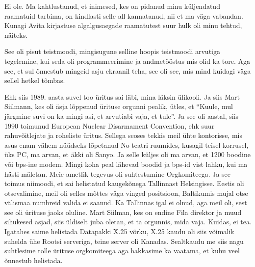 
Ei ole. Ma kahtlustanud, et inimesed, kes on pidanud minu küljendatud raamatuid 
tarbima, on kindlasti selle all kannatanud, nii et ma väga vabandan. Kunagi  
Avita kirjastuse  algalgusaegade raamatutest suur hulk 
oli minu tehtud, näiteks.


See oli pisut teistmoodi, mingisugune selline hoopis teistmoodi  arvutiga 
tegelemine, kui seda  oli  programmeerimine ja andmetööstus mis olid ka tore. 
Aga see, et sul õnnestub mingeid asju ekraanil teha, see oli see, mis mind 
kuidagi väga sellel hetkel tõmbas. 

Ehk siis 1989. aasta suvel too üritus sai läbi, mina läksin ülikooli. Ja siis 
Mart Siilmann, kes oli äsja lõppenud ürituse orgunni 
pealik, ütles, et \enquote{Kuule, mul järgmine suvi on ka mingi asi, et 
arvutiabi vaja, et tule}. Ja see oli aastal, siis 1990 toimunud European 
Nuclear Disarmament Convention, ehk suur rahuvõitlejate ja roheliste üritus. 
Sellega seoses tekkis meil ühte kontorisse, mis asus enam-vähem nüüdseks 
lõpetanud No-teatri ruumides, kusagil teisel korrusel, üks PC, ma arvan, et 
äkki oli Sanyo. Ja selle küljes oli ma arvan, et 1200 boodine või bps-ine 
modem. Mingi koha peal lähevad boodid ja bps-id vist lahku, kui ma hästi 
mäletan. 
 Meie ametlik tegevus oli suhtestumine Orgkomiteega. Ja see toimus niimoodi, et 
sai  helistatud kaugekõnega Tallinnast Helsingisse. Eestis oli otsevalimine, 
meil oli selles mõttes väga vinged positsioon, Baltikumis mujal otse välismaa 
numbreid valida ei saanud. Ka Tallinnas igal ei olnud, aga meil oli, sest see 
oli ürituse jaoks oluline. Mart Siilman, kes on endine Fila direktor ja muud sihukesed 
asjad, siis üldiselt juba oletan, et ta orgunnis, mida vaja. Kuidas, ei tea. 
Igatahes saime helistada Datapakki X.25 võrku,  X.25 kaudu oli siis võimalik 
suhelda ühe Rootsi serveriga, teine server oli Kanadas. Sealtkaudu me siis nagu 
suhtlesime tolle ürituse orgkomiteega aga  hakkasime ka vaatama, et kuhu veel 
õnnestub helistada.

